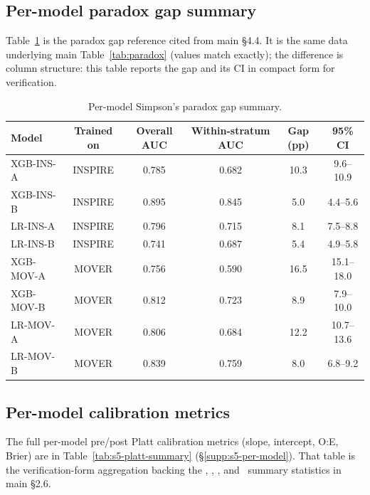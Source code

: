 \documentclass[11pt,a4paper]{article}
\begin{document}
\subsection{Per-model paradox gap summary}\label{supp:s6-paradox-summary}

Table~\ref{tab:paradox_summary} is the paradox gap reference cited from
main \S4.4. It is the same data underlying main Table~\ref{tab:paradox}
(values match exactly); the difference is column structure: this table
reports the gap and its CI in compact form for verification.

\begin{table}[H]
\centering
\caption{Per-model Simpson's paradox gap summary.}
\label{tab:paradox_summary}
\setlength{\tabcolsep}{6pt}
\small
\begin{tabular}{lccccc}
\toprule
\textbf{Model} & \textbf{Trained on} & \textbf{Overall AUC} & \textbf{Within-stratum AUC} & \textbf{Gap (pp)} & \textbf{95\% CI} \\
\midrule
XGB-INS-A & INSPIRE & 0.785 & 0.682 & 10.3 & 9.6--10.9 \\
XGB-INS-B & INSPIRE & 0.895 & 0.845 &  5.0 & 4.4--5.6 \\
LR-INS-A  & INSPIRE & 0.796 & 0.715 &  8.1 & 7.5--8.8 \\
LR-INS-B  & INSPIRE & 0.741 & 0.687 &  5.4 & 4.9--5.8 \\
XGB-MOV-A & MOVER   & 0.756 & 0.590 & 16.5 & 15.1--18.0 \\
XGB-MOV-B & MOVER   & 0.812 & 0.723 &  8.9 & 7.9--10.0 \\
LR-MOV-A  & MOVER   & 0.806 & 0.684 & 12.2 & 10.7--13.6 \\
LR-MOV-B  & MOVER   & 0.839 & 0.759 &  8.0 & 6.8--9.2 \\
\bottomrule
\end{tabular}
\end{table}

\subsection{Per-model calibration metrics}\label{supp:s6-calibration}

The full per-model pre/post Platt calibration metrics (slope, intercept,
O:E, Brier) are in Table~\ref{tab:s5-platt-summary}
(§\ref{supp:s5-per-model}). That table
is the verification-form aggregation backing the \pnCalibSlopePreRangeFull,
\pnCalibSlopePostRangeFull, \pnOERatioPostRangeFull, and
\pnBrierMeanImprovementPct\ summary statistics in main \S2.6.
\end{document}
